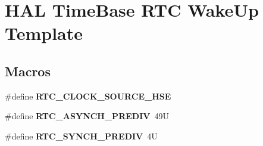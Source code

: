 \hypertarget{group___h_a_l___time_base___r_t_c___wake_up___template}{}\section{H\+AL Time\+Base R\+TC Wake\+Up Template}
\label{group___h_a_l___time_base___r_t_c___wake_up___template}
\subsection*{Macros}
\begin{DoxyCompactItemize}
\item 
\mbox{\label{group___h_a_l___time_base___r_t_c___wake_up___template_ga5da1cd82e5ae713267918a9c85b4dc77}} 
\#define {\bfseries R\+T\+C\+\_\+\+C\+L\+O\+C\+K\+\_\+\+S\+O\+U\+R\+C\+E\+\_\+\+H\+SE}
\item 
\mbox{\label{group___h_a_l___time_base___r_t_c___wake_up___template_gac483fb44f1611ddb407a4aacec7ae4e7}} 
\#define {\bfseries R\+T\+C\+\_\+\+A\+S\+Y\+N\+C\+H\+\_\+\+P\+R\+E\+D\+IV}~49U
\item 
\mbox{\label{group___h_a_l___time_base___r_t_c___wake_up___template_ga433a49865e4af2e0972e6bbbea894d51}} 
\#define {\bfseries R\+T\+C\+\_\+\+S\+Y\+N\+C\+H\+\_\+\+P\+R\+E\+D\+IV}~4U
\end{DoxyCompactItemize}
